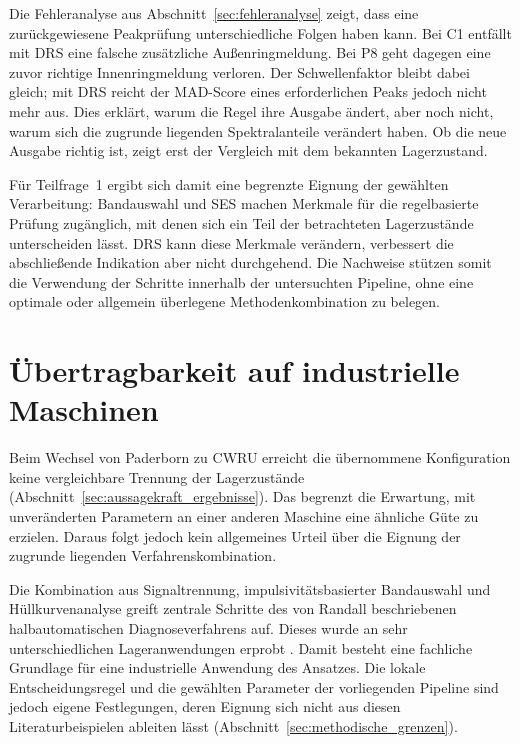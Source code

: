 Die Fehleranalyse aus Abschnitt~\ref{sec:fehleranalyse} zeigt, dass eine
zurückgewiesene Peakprüfung unterschiedliche Folgen haben kann. Bei C1
entfällt mit DRS eine falsche zusätzliche Außenringmeldung. Bei P8 geht
dagegen eine zuvor richtige Innenringmeldung verloren. Der Schwellenfaktor
bleibt dabei gleich; mit DRS reicht der MAD-Score eines erforderlichen
Peaks jedoch nicht mehr aus.
Dies erklärt, warum die Regel ihre Ausgabe ändert, aber noch nicht, warum
sich die zugrunde liegenden Spektralanteile verändert haben. Ob die neue
Ausgabe richtig ist, zeigt erst der Vergleich mit dem bekannten Lagerzustand.

Für Teilfrage~1 ergibt sich damit eine begrenzte Eignung der gewählten
Verarbeitung: Bandauswahl und SES machen Merkmale für die regelbasierte
Prüfung zugänglich, mit denen sich ein Teil der betrachteten Lagerzustände
unterscheiden lässt. DRS kann diese Merkmale verändern, verbessert die
abschließende Indikation aber nicht durchgehend. Die Nachweise stützen somit
die Verwendung der Schritte innerhalb der untersuchten Pipeline, ohne eine
optimale oder allgemein überlegene Methodenkombination zu belegen.

\section{Übertragbarkeit auf industrielle Maschinen}
\label{sec:industrielle_uebertragbarkeit}

Beim Wechsel von Paderborn zu CWRU erreicht die übernommene Konfiguration
keine vergleichbare Trennung der Lagerzustände
(Abschnitt~\ref{sec:aussagekraft_ergebnisse}). Das begrenzt die Erwartung,
mit unveränderten Parametern an einer anderen Maschine eine ähnliche
Güte zu erzielen. Daraus folgt jedoch kein allgemeines Urteil über die
Eignung der zugrunde liegenden Verfahrenskombination.

Die Kombination aus Signaltrennung, impulsivitätsbasierter Bandauswahl
und Hüllkurvenanalyse greift zentrale Schritte des von Randall
beschriebenen halbautomatischen Diagnoseverfahrens auf. Dieses wurde an
sehr unterschiedlichen Lageranwendungen erprobt
\cite[S.~277--278, Abschn.~7.3.2 und Abb.~7.47]
{randallVibrationbasedConditionMonitoring2022}.
Damit besteht eine fachliche Grundlage für eine industrielle Anwendung
des Ansatzes. Die lokale Entscheidungsregel und die gewählten Parameter
der vorliegenden Pipeline sind jedoch eigene Festlegungen, deren
Eignung sich nicht aus diesen Literaturbeispielen ableiten lässt
(Abschnitt~\ref{sec:methodische_grenzen}).

